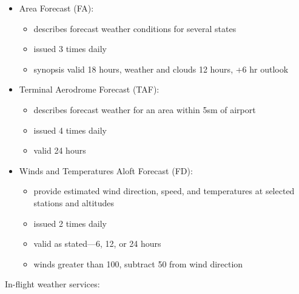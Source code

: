 \begin{itemize}
  \item Area Forecast (FA):
    \begin{itemize}
      \item describes forecast weather conditions for several states
      \item issued 3 times daily
      \item synopsis valid 18 hours, weather and clouds 12 hours, +6 hr outlook
    \end{itemize}
  \item Terminal Aerodrome Forecast (TAF):
    \begin{itemize}
      \item describes forecast weather for an area within 5sm of airport
      \item issued 4 times daily
      \item valid 24 hours
    \end{itemize}
  \item Winds and Temperatures Aloft Forecast (FD):
    \begin{itemize}
      \item provide estimated wind direction, speed, and temperatures at
        selected stations and altitudes
      \item issued 2 times daily
      \item valid as stated—6, 12, or 24 hours
      \item winds greater than 100, subtract 50 from wind direction
    \end{itemize}
\end{itemize}

In-flight weather services:

